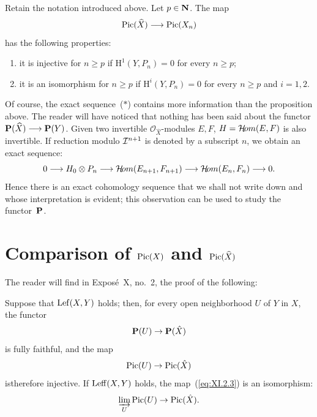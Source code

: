 \begin{proposition}\label{XI.1.1}
Retain the notation introduced above. Let $p\in\mathbf N$. The map
\[
  \operatorname{Pic}(\widehat X)\longrightarrow\operatorname{Pic}(X_n)
\]
has the following properties:


\begin{enumerate}
\renewcommand{\labelenumi}{(\roman{enumi})}
\item it is injective for $n\geq p$ if $\mathrm H^1(Y,P_n)=0$ for every
$n\geq p$;
\item it is an isomorphism for $n\geq p$ if $\mathrm H^i(Y,P_n)=0$ for
every $n\geq p$ and $i=1,2$.
\end{enumerate}
\end{proposition}

Of course, the exact sequence~\textup{($\ast$)} contains more
information than the proposition above. The reader will have noticed that
nothing has been said about the functor
$\mathbf P(\widehat X)\longrightarrow\mathbf P(Y)$. Given two invertible
$\mathcal O_{\widehat X}$-modules $E,F$,
$H=\mathcal H\!om(E,F)$ is also invertible. If reduction modulo
$\mathcal I^{n+1}$ is denoted by a subscript $n$, we obtain an exact sequence:
\[
0\longrightarrow H_0\otimes P_n
\longrightarrow \mathcal H\!om(E_{n+1},F_{n+1})
\longrightarrow \mathcal H\!om(E_n,F_n)
\longrightarrow 0.
\]
Hence there is an exact cohomology sequence that we shall not write down and
whose interpretation is evident; this observation can be used to study the
functor~$\mathbf P$.

\section{\texorpdfstring{Comparison of $\operatorname{Pic}(X)$ and $\operatorname{Pic}(\widehat X)$}{Comparison of Pic(X) and Pic(X-hat)}}\label{XI.2}

The reader will find in Expos\'e~X, no.~2, the proof of the following:






\begin{proposition} \label{XI.2.1} Suppose that $\operatorname{Lef}(X, Y)$ holds; then, for every open neighborhood $U$ of $Y$ in $X$, the functor
\begin{equation} \label{eq:XI.2.1} \mathbf P(U)\to\mathbf P(\hat X)
\end{equation}
is fully faithful, and the map
\begin{equation} \label{eq:XI.2.2} \operatorname{Pic}(U)\to\operatorname{Pic}(\hat X)
\end{equation}
is\pageoriginale therefore injective. If $\operatorname{Leff}(X, Y)$ holds, the map~(\ref{eq:XI.2.3}) is an isomorphism:
\begin{equation} \label{eq:XI.2.3}
\varinjlim_U\operatorname{Pic}(U)\to\operatorname{Pic}(\hat X){}.
\end{equation}
\end{proposition}

